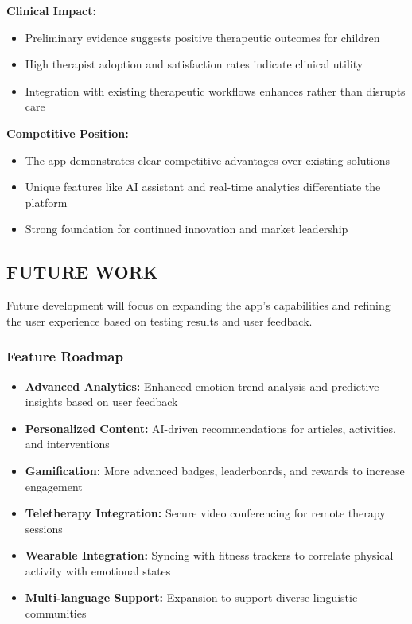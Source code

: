 \documentclass[12pt,a4paper]{article}
\newcommand{\sectiontitle}[1]{\subsection{#1}}
\newcommand{\subsectiontitle}[1]{\subsubsection{#1}}
\begin{document}
\textbf{Clinical Impact:}
\begin{itemize}
    \item Preliminary evidence suggests positive therapeutic outcomes for children
    \item High therapist adoption and satisfaction rates indicate clinical utility
    \item Integration with existing therapeutic workflows enhances rather than disrupts care
\end{itemize}

\textbf{Competitive Position:}
\begin{itemize}
    \item The app demonstrates clear competitive advantages over existing solutions
    \item Unique features like AI assistant and real-time analytics differentiate the platform
    \item Strong foundation for continued innovation and market leadership
\end{itemize}

\sectiontitle{FUTURE WORK}

Future development will focus on expanding the app's capabilities and refining the user experience based on testing results and user feedback.

\subsectiontitle{Feature Roadmap}

\begin{minipage}{\linewidth}
\begin{itemize}
    \item \textbf{Advanced Analytics:} Enhanced emotion trend analysis and predictive insights based on user feedback
    \item \textbf{Personalized Content:} AI-driven recommendations for articles, activities, and interventions
    \item \textbf{Gamification:} More advanced badges, leaderboards, and rewards to increase engagement
    \item \textbf{Teletherapy Integration:} Secure video conferencing for remote therapy sessions
    \item \textbf{Wearable Integration:} Syncing with fitness trackers to correlate physical activity with emotional states
    \item \textbf{Multi-language Support:} Expansion to support diverse linguistic communities
\end{itemize}
\end{minipage}
\end{document}
